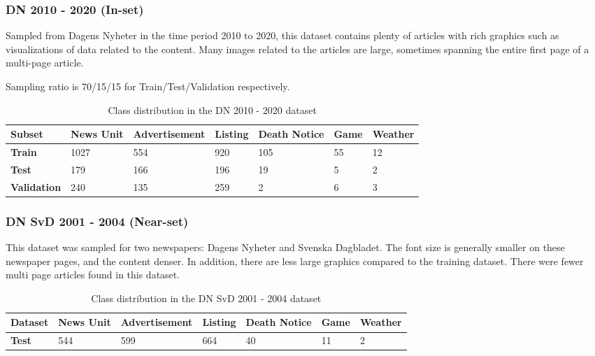 \documentclass[oneside, english, bibtex]{kththesis}
\begin{document}
\subsubsection{DN 2010 - 2020 (In-set)}

Sampled from Dagens Nyheter in the time period 2010 to 2020,
this dataset contains plenty of articles with rich graphics such as visualizations of data related to the content.
Many images related to the articles are large, sometimes spanning the entire first page of a multi-page article.

Sampling ratio is 70/15/15 for Train/Test/Validation respectively.

\begin{table}[!ht]
  \begin{center}
    \caption{Class distribution in the DN 2010 - 2020 dataset}
    \label{tab:trainclassdist}
    \begin{tabular}{l|l|l|l|l|l|l} %
    \textbf{Subset} & \textbf{News Unit} & \textbf{Advertisement} & \textbf{Listing} & \textbf{Death Notice} & \textbf{Game} & \textbf{Weather}  \\
    \hline
    \textbf{Train} & 1027 & 554 & 920 & 105 & 55 & 12 \\    \hline
    \textbf{Test} & 179 & 166 & 196 & 19 & 5 & 2 \\    \hline
    \textbf{Validation} & 240 & 135 & 259 & 2 & 6 & 3 \\    \hline
    \end{tabular}
  \end{center}
\end{table}

\subsubsection{DN SvD 2001 - 2004 (Near-set)}

This dataset was sampled for two newspapers: Dagens Nyheter and Svenska Dagbladet. The font size is generally smaller on these newspaper pages, and the content denser. In addition, there are less large graphics compared to the training dataset. There were fewer multi page articles found in this dataset.

\begin{table}[!ht]
  \begin{center}
    \caption{Class distribution in the  DN SvD 2001 - 2004 dataset}
    \label{tab:insetclassdist}
    \begin{tabular}{l|l|l|l|l|l|l} %
    \textbf{Dataset} & \textbf{News Unit} & \textbf{Advertisement} & \textbf{Listing} & \textbf{Death Notice} & \textbf{Game} & \textbf{Weather}  \\
    \hline
    \textbf{Test} & 544 & 599 & 664 & 40 & 11 & 2 \\    \hline
    \end{tabular}
  \end{center}
\end{table}
\end{document}
